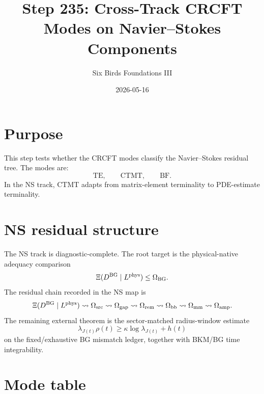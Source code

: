 \documentclass[11pt]{article}
\title{Step 235: Cross-Track CRCFT Modes on Navier--Stokes Components}
\author{Six Birds Foundations III}
\date{2026-05-16}
\begin{document}
\maketitle

\section{Purpose}

This step tests whether the CRCFT modes classify the Navier--Stokes residual tree. The modes are:
\[
\text{TE},\qquad \text{CTMT},\qquad \text{BF}.
\]
In the NS track, CTMT adapts from matrix-element terminality to PDE-estimate terminality.

\section{NS residual structure}

The NS track is diagnostic-complete. The root target is the physical-native adequacy comparison
\[
\Xi(D^{\rm BG}\mid L^{\rm phys})\leq \Omega_{\rm BG}.
\]
The residual chain recorded in the NS map is
\[
\Xi(D^{\rm BG}\mid L^{\rm phys})
\leadsto
\Omega_{\rm src}
\leadsto
\Omega_{\rm gap}
\leadsto
\Omega_{\rm rem}
\leadsto
\Omega_{\rm bb}
\leadsto
\Omega_{\rm mm}
\leadsto
\Omega_{\rm amp}.
\]
The remaining external theorem is the sector-matched radius-window estimate
\[
\lambda_{J(t)}\rho(t)\geq \kappa\log \lambda_{J(t)}+h(t)
\]
on the fixed/exhaustive BG mismatch ledger, together with BKM/BG time integrability.

\section{Mode table}
\end{document}
